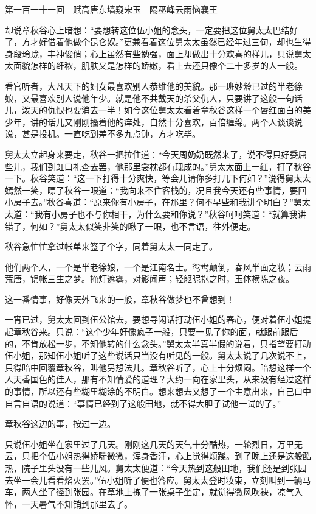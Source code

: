 \documentclass[12pt,UTF8]{ctexbook}
\begin{document}
{{{第一百一十一回　赋高唐东墙窥宋玉　隔巫峰云雨恼襄王





却说章秋谷心上暗想：“要想转这位伍小姐的念头，一定要把这位舅太太巴结好了，方才好借着他做个昆仑奴。”更兼看着这位舅太太虽然已经年过三旬，却也生得身段玲珑，丰神俊俏；心上虽然有些勉强，面上却做出十分欢喜的样儿，只说舅太太面貌怎样的纤秾，肌肤又是怎样的娇嫩，看上去还只像个二十多岁的人一般。

看官听者，大凡天下的妇女最喜欢别人恭维他的美貌。那一班妙龄已过的半老徐娘，又最喜欢别人说他年少。就是他不共戴天的杀父仇人，只要讲了这般一句话儿，泼天的仇恨也要消去一半！如今这位舅太太看着章秋谷这样一个唇红面白的美少年，讲的话儿又刚刚搔着他的痒处，自然十分喜欢，百倍缠绵。两个人谈谈说说，甚是投机。一直吃到差不多九点钟，方才吃毕。

舅太太立起身来要走，秋谷一把拉住道：“今天周奶奶既然来了，说不得只好委屈些儿，我们到虹口礼查去罢，他那里衾枕都有现成的。”舅太太面上一红，打了秋谷一下。秋谷笑道：“这一下打得十分爽快，等会儿请你多打几下何如？”说得舅太太嫣然一笑，瞟了秋谷一眼道：“我向来不住客栈的，况且我今天还有些事情，要回小房子去。”秋谷喜道：“原来你有小房子，在那里？何不早些和我讲个明白？”舅太太道：“我有小房子也不与你相干，为什么要和你说？”秋谷呵呵笑道：“就算我讲错了，何如？”舅太太似笑非笑的瞅了一眼，也不言语，往外便走。

秋谷急忙忙拿过帐单来签了个字，同着舅太太一同走了。

他们两个人，一个是半老徐娘，一个是江南名士。鸳鸯颠倒，春风半面之妆；云雨荒唐，锦帐三生之梦。掩灯遮雾，对影闻声；轻躯昵抱之时，玉体横陈之夜。

这一番情事，好像天外飞来的一般，章秋谷做梦也不曾想到！

一宵已过，舅太太回到伍公馆去，要想寻闲话打动伍小姐的春心，便对着伍小姐提起章秋谷来。只说：“这个少年好像疯子一般，只要一见了你的面，就跟前跟后的，不肯放松一步，不知他转的什么念头。”舅太太半真半假的说着，只指望要打动伍小姐，那知伍小姐听了这些说话只当没有听见的一般。舅太太说了几次说不上，只得暗中回覆章秋谷，叫他另想法儿。章秋谷听了，心上十分烦闷。暗想这样一个人天香国色的佳人，那有不知情爱的道理？大约一向在家里头，从来没有经过这样的事情，所以还有些糊里糊涂的不明白。想来想去又想了一个主意出来，自己口中自言自语的说道：“事情已经到了这般田地，就不得大胆子试他一试的了。”

章秋谷这边的事，按过一边。

只说伍小姐坐在家里过了几天。刚刚这几天的天气十分酷热，一轮烈日，万里无云，只把个伍小姐热得娇喘微微，浑身香汗，心上觉得烦躁。到了晚上还是这般酷热，院子里头没有一些儿风。舅太太便道：“今天热到这般田地，我们还是到张园去坐一会儿看看焰火罢。”伍小姐听了便也答应。舅太太登时妆束，立刻叫到一辆马车，两人坐了径到张园。在草地上拣了一张桌子坐定，就觉得微风吹袂，凉气入怀，一天暑气不知销到那里去了。

}}}
\end{document}

